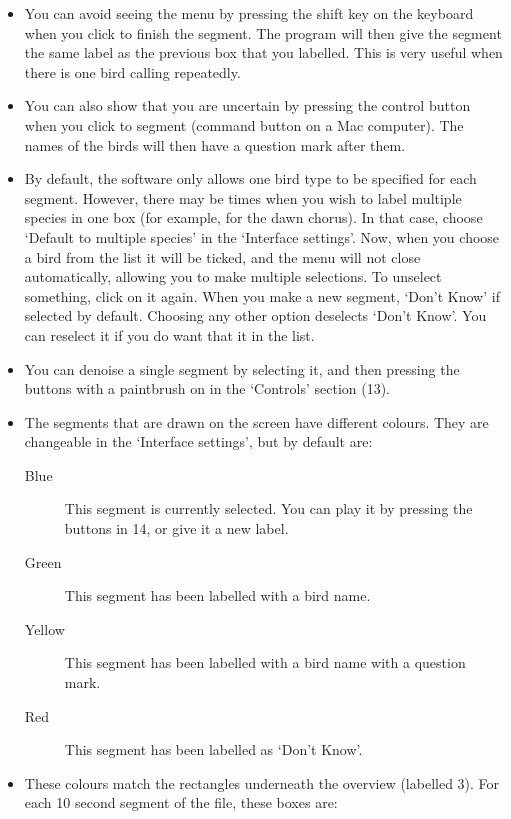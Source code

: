 \documentclass{article}
\begin{document}
\begin{itemize}
\item You can avoid seeing the menu by pressing the shift key on the keyboard when you click to finish the segment. The program will then give the segment the same label as the previous box that you labelled. This is very useful when there is one bird calling repeatedly.

\item You can also show that you are uncertain by pressing the control button when you click to segment (command button on a Mac computer). The names of the birds will then have a question mark after them. 

\item By default, the software only allows one bird type to be specified for each segment. However, there may be times when you wish to label multiple species in one box (for example, for the dawn chorus). In that case, choose `Default to multiple species' in the `Interface settings'. Now, when you choose a bird from the list it will be ticked, and the menu will not close automatically, allowing you to make multiple selections. To unselect something, click on it again. When you make a new segment, `Don't Know' if selected by default. Choosing any other option deselects `Don't Know'. You can reselect it if you do want that it in the list. 

\item You can denoise a single segment by selecting it, and then pressing the buttons with a paintbrush on in the `Controls' section (13). 

\item The segments that are drawn on the screen have different colours. They are changeable in the `Interface settings', but by default are:
	\begin{description} 
	\item[Blue] This segment is currently selected. You can play it by pressing the buttons in 14, or give it a new label. 
	\item[Green] This segment has been labelled with a bird name.
	\item[Yellow] This segment has been labelled with a bird name with a question mark.
	\item[Red] This segment has been labelled as `Don't Know'.
	\end{description}

\item These colours match the rectangles underneath the overview (labelled 3). For each 10 second segment of the file, these boxes are:


\end{itemize}
\end{document}
